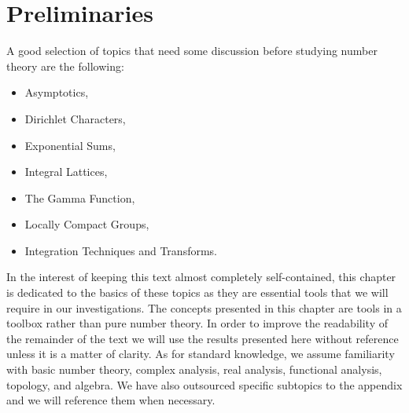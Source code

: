 \chapter{Preliminaries}\label{ch:Preliminaries}
  A good selection of topics that need some discussion before studying number theory are the following:
  \begin{itemize}
    \item Asymptotics,
    \item Dirichlet Characters,
    \item Exponential Sums,
    \item Integral Lattices,
    \item The Gamma Function,
    \item Locally Compact Groups,
    \item Integration Techniques and Transforms.
  \end{itemize}
  In the interest of keeping this text almost completely self-contained, this chapter is dedicated to the basics of these topics as they are essential tools that we will require in our investigations. The concepts presented in this chapter are tools in a toolbox rather than pure number theory. In order to improve the readability of the remainder of the text we will use the results presented here without reference unless it is a matter of clarity. As for standard knowledge, we assume familiarity with basic number theory, complex analysis, real analysis, functional analysis, topology, and algebra. We have also outsourced specific subtopics to the appendix and we will reference them when necessary.
